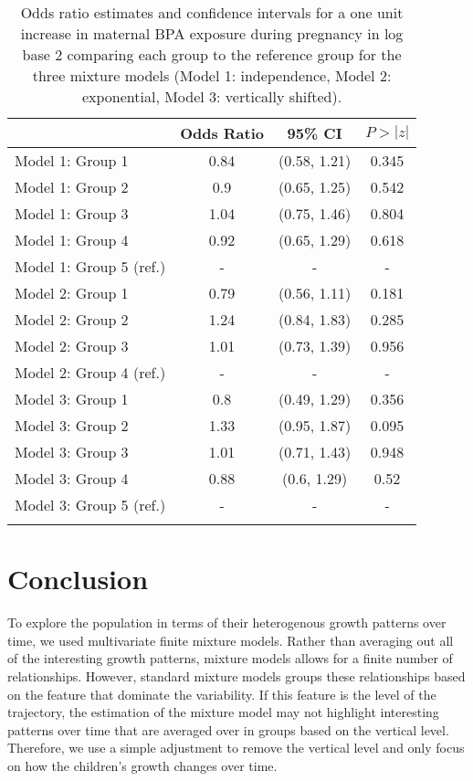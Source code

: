\begin{table}[ht]
\begin{center}
\begin{tabular}{lccc}
  \thickhline
 & Odds Ratio & 95\% CI & $P>|z|$ \\ 
  \hline
Model 1: Group  1 & 0.84 & (0.58, 1.21) & 0.345 \\ 
  Model 1: Group  2 & 0.9 & (0.65, 1.25) & 0.542 \\ 
  Model 1: Group  3 & 1.04 & (0.75, 1.46) & 0.804 \\ 
  Model 1: Group  4 & 0.92 & (0.65, 1.29) & 0.618 \\ 
  Model 1: Group  5  (ref.) & - & - & - \\ 
  Model 2: Group  1 & 0.79 & (0.56, 1.11) & 0.181 \\ 
  Model 2: Group  2 & 1.24 & (0.84, 1.83) & 0.285 \\ 
  Model 2: Group  3 & 1.01 & (0.73, 1.39) & 0.956 \\ 
  Model 2: Group  4  (ref.) & - & - & - \\ 
  Model 3: Group  1 & 0.8 & (0.49, 1.29) & 0.356 \\ 
  Model 3: Group  2 & 1.33 & (0.95, 1.87) & 0.095 \\ 
  Model 3: Group  3 & 1.01 & (0.71, 1.43) & 0.948 \\ 
  Model 3: Group  4 & 0.88 & (0.6, 1.29) & 0.52 \\ 
  Model 3: Group  5  (ref.) & - & - & - \\ 
   \thickhline
\end{tabular}
\caption{Odds ratio estimates and confidence intervals for a one unit increase in maternal BPA exposure during pregnancy in log base 2 comparing each group to the reference group for the three mixture models (Model 1: independence, Model 2: exponential, Model 3: vertically shifted). }
\end{center}
\label{tab:6-2}
\end{table}

\section{Conclusion}
To explore the population in terms of their heterogenous growth patterns over time, we used multivariate finite mixture models. Rather than averaging out all of the interesting growth patterns, mixture models allows for a finite number of relationships. However, standard mixture models groups these relationships based on the feature that dominate the variability. If this feature is the level of the trajectory, the estimation of the mixture model may not highlight interesting patterns over time that are averaged over in groups based on the vertical level. Therefore, we use a simple adjustment to remove the vertical level and only focus on how the children's growth changes over time.

